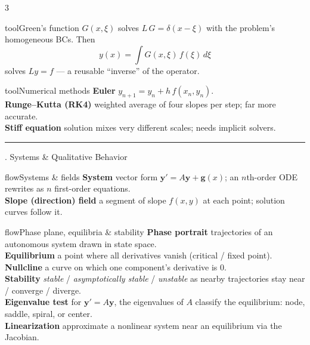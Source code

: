\documentclass[10pt]{article}
\newcommand{\lab}[1]{\textcolor{ink}{\sffamily\footnotesize\textbf{#1}}\;}
\newcommand{\sect}[2]{%
  \begin{tcolorbox}[blanker, breakable, before skip=2pt, after skip=2pt]
    \begingroup\sffamily\bfseries\normalsize\color{#1}%
    {\color{#1}\rule[-1pt]{3pt}{12pt}}\;#2\endgroup
    \par\vspace{1pt}{\color{#1}\hrule height 1pt}
\end{tcolorbox}}
\begin{document}
\begin{multicols}{3}
  \begin{card}{tool}{Green's function}
    \(G(x,\xi)\) solves \(L\,G=\delta(x-\xi)\) with the problem's homogeneous BCs. Then
    \[ y(x)=\int G(x,\xi)\,f(\xi)\,d\xi \]
    solves \(Ly=f\) --- a reusable ``inverse'' of the operator.
  \end{card}

  \begin{card}{tool}{Numerical methods}
    \lab{Euler} \(y_{n+1}=y_{n}+h\,f(x_{n},y_{n})\).\\
    \lab{Runge--Kutta (RK4)} weighted average of four slopes per step; far more accurate.\\
    \lab{Stiff equation} solution mixes very different scales; needs implicit solvers.
  \end{card}

  \sect{flow}{10.\; Systems \& Qualitative Behavior}

  \begin{card}{flow}{Systems \& fields}
    \lab{System} vector form \(\mathbf{y}'=A\mathbf{y}+\mathbf{g}(x)\); an \(n\)th-order ODE rewrites as \(n\) first-order equations.\\
    \lab{Slope (direction) field} a segment of slope \(f(x,y)\) at each point; solution curves follow it.
  \end{card}

  \begin{card}{flow}{Phase plane, equilibria \& stability}
    \lab{Phase portrait} trajectories of an autonomous system drawn in state space.\\
    \lab{Equilibrium} a point where all derivatives vanish (critical / fixed point).\\
    \lab{Nullcline} a curve on which one component's derivative is \(0\).\\
    \lab{Stability} \emph{stable} / \emph{asymptotically stable} / \emph{unstable} as nearby trajectories stay near / converge / diverge.\\
    \lab{Eigenvalue test} for \(\mathbf{y}'=A\mathbf{y}\), the eigenvalues of \(A\) classify the equilibrium: node, saddle, spiral, or center.\\
    \lab{Linearization} approximate a nonlinear system near an equilibrium via the Jacobian.
  \end{card}

\end{multicols}
\end{document}
